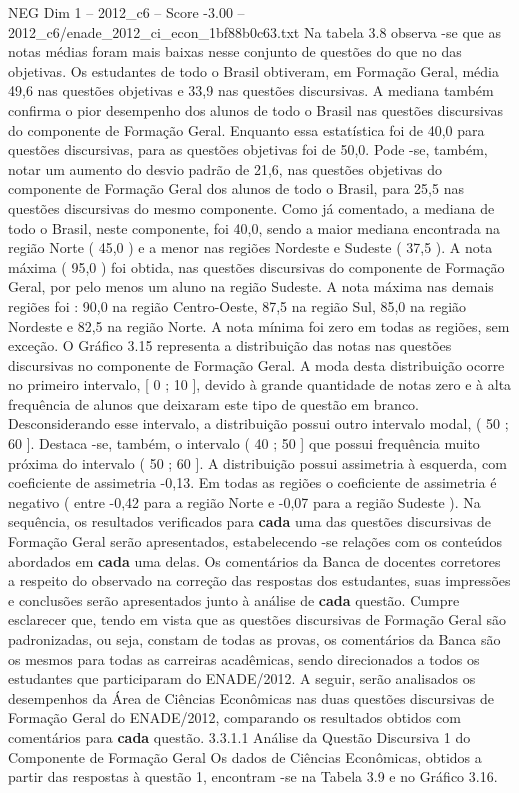 \begin{textsample}{NEG Dim 1 – 2012\_c6 – Score -3.00 – 2012\_c6/enade\_2012\_ci\_econ\_1bf88b0c63.txt}
Na tabela 3.8 observa -se que as notas médias foram mais baixas nesse conjunto de questões do que no das objetivas.
Os estudantes de todo o Brasil obtiveram, em Formação Geral, média 49,6 nas questões objetivas e 33,9 nas questões discursivas.
A mediana também confirma o pior desempenho dos alunos de todo o Brasil nas questões discursivas do componente de Formação Geral.
Enquanto essa estatística foi de 40,0 para questões discursivas, para as questões objetivas foi de 50,0.
Pode -se, também, notar um aumento do desvio padrão de 21,6, nas questões objetivas do componente de Formação Geral dos alunos de todo o Brasil, para 25,5 nas questões discursivas do mesmo componente.
Como já comentado, a mediana de todo o Brasil, neste componente, foi 40,0, sendo a maior mediana encontrada na região Norte ( 45,0 ) e a menor nas regiões Nordeste e Sudeste ( 37,5 ).
A nota máxima ( 95,0 ) foi obtida, nas questões discursivas do componente de Formação Geral, por pelo menos um aluno na região Sudeste.
A nota máxima nas demais regiões foi : 90,0 na região Centro-Oeste, 87,5 na região Sul, 85,0 na região Nordeste e 82,5 na região Norte.
A nota mínima foi zero em todas as regiões, sem exceção.
O Gráfico 3.15 representa a distribuição das notas nas questões discursivas no componente de Formação Geral.
A moda desta distribuição ocorre no primeiro intervalo, [ 0 ; 10 ], devido à grande quantidade de notas zero e à alta frequência de alunos que deixaram este tipo de questão em branco.
Desconsiderando esse intervalo, a distribuição possui outro intervalo modal, ( 50 ; 60 ].
Destaca -se, também, o intervalo ( 40 ; 50 ] que possui frequência muito próxima do intervalo ( 50 ; 60 ].
A distribuição possui assimetria à esquerda, com coeficiente de assimetria -0,13.
Em todas as regiões o coeficiente de assimetria é negativo ( entre -0,42 para a região Norte e -0,07 para a região Sudeste ).
Na sequência, os resultados verificados para \textbf{cada} uma das questões discursivas de Formação Geral serão apresentados, estabelecendo -se relações com os conteúdos abordados em \textbf{cada} uma delas.
Os comentários da Banca de docentes corretores a respeito do observado na correção das respostas dos estudantes, suas impressões e conclusões serão apresentados junto à análise de \textbf{cada} questão.
Cumpre esclarecer que, tendo em vista que as questões discursivas de Formação Geral são padronizadas, ou seja, constam de todas as provas, os comentários da Banca são os mesmos para todas as carreiras acadêmicas, sendo direcionados a todos os estudantes que participaram do ENADE/2012.
A seguir, serão analisados os desempenhos da Área de Ciências Econômicas nas duas questões discursivas de Formação Geral do ENADE/2012, comparando os resultados obtidos com comentários para \textbf{cada} questão. 3.3.1.1 Análise da Questão Discursiva 1 do Componente de Formação Geral Os dados de Ciências Econômicas, obtidos a partir das respostas à questão 1, encontram -se na Tabela 3.9 e no Gráfico 3.16.

\end{textsample}
